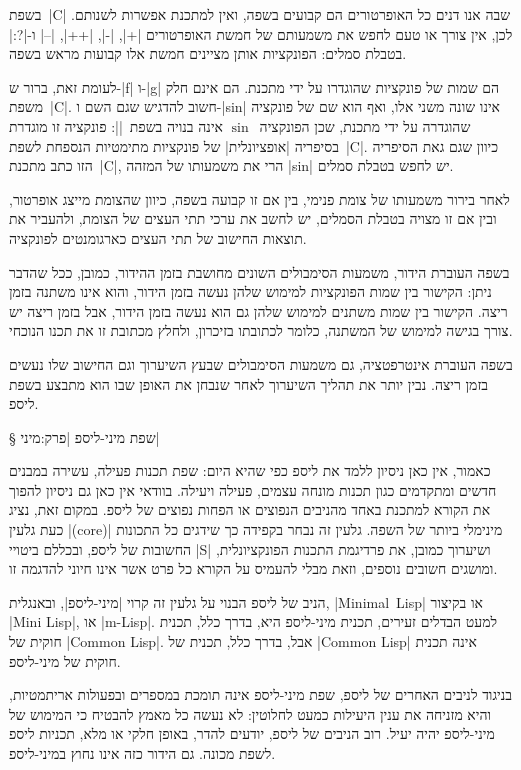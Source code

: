 בשפת~\E|C| שבה אנו דנים כל האופרטורים הם קבועים בשפה, ואין למתכנת אפשרות
לשנותם. לכן, אין צורך או טעם לחפש את משמעותם של חמשת האופרטורים \T|+|, \T|-|,
\T|++|, \T|--| ו-\T|?:| בטבלת סמלים: הפונקציות אותן מציינים חמשת אלו קבועות
מראש בשפה.

לעומת זאת, ברור ש-\T|f| ו-\T|g| הם שמות של פונקציות שהוגדרו על ידי מתכנת. הם
אינם חלק משפת~\E|C|. חשוב להדגיש שגם השם ו-\T|sin| אינו שונה משני אלו, ואף הוא
שם של פונקציה שהוגדרה על ידי מתכנת, שכן הפונקציה~$\sin$ אינה בנויה
בשפת~\E|\CPL|: פונקציה זו מוגדרת בסיפריה \ע|אופציונלית| של פונקציות מתימטיות
הנספחת לשפת~\E|C|. כיוון שגם גאת הסיפריה הזו כתב מתכנת~\E|C|, הרי את משמעותו
של המזהה \T|sin| יש לחפש בטבלת סמלים.

לאחר בירור משמעותו של צומת פנימי, בין אם זו קבועה בשפה, כיוון שהצומת מייצג
אופרטור, ובין אם זו מצויה בטבלת הסמלים, יש לחשב את ערכי תתי העצים של הצומת,
ולהעביר את תוצאות החישוב של תתי העצים כארגומנטים לפונקציה.

בשפה העוברת הידור, משמעות הסימבולים השונים מחושבת בזמן ההידור, כמובן, ככל שהדבר
ניתן: הקישור בין שמות הפונקציות למימוש שלהן נעשה בזמן הידור, והוא אינו משתנה
בזמן ריצה. הקישור בין שמות משתנים למימוש שלהן גם הוא נעשה בזמן הידור, אבל בזמן
ריצה יש צורך בגישה למימוש של המשתנה, כלומר לכתובתו בזיכרון, ולחלץ מכתובת זו את
תכנו הנוכחי.

בשפה העוברת אינטרפטציה, גם משמעות הסימבולים שבעץ השיערוך וגם החישוב שלו נעשים
בזמן ריצה. נבין יותר את תהליך השיערוך לאחר שנבחן את האופן שבו הוא מתבצע בשפת
ליספ.

§ שפת מיני-ליספ
|פרק:מיני|

כאמור, אין כאן ניסיון ללמד את ליספ כפי שהיא היום: שפת תכנות פעילה, עשירה
במבנים חדשים ומתקדמים כגון תכנות מונחה עצמים, פעילה ויעילה. בוודאי אין כאן גם
ניסיון להפוך את הקורא למתכנת באחד מהניבים הנפוצים או הפחות נפוצים של ליספ.
במקום זאת, נציג כעת גלעין \E|(core)| מינימלי ביותר של השפה. גלעין זה נבחר
בקפידה כך שידגים כל התכונות החשובות של ליספ, ובכללם ביטויי \E|S| ושיערוך כמובן,
את פרדיגמת התכנות הפונקציונלית, ומושגים חשובים נוספים, וזאת מבלי להעמיס על
הקורא כל פרט אשר אינו חיוני להדגמה זו.

הניב של ליספ הבנוי על גלעין זה קרוי \ע|מיני-ליספ|, ובאנגלית, \E|Minimal~Lisp|
או בקיצור \E|Mini Lisp|, או \E|m-Lisp|. למעט הבדלים זעירים, תכנית מיני-ליספ
היא, בדרך כלל, תכנית חוקית של \E|Common Lisp|. אבל, בדרך כלל, תכנית של
\E|Common Lisp| אינה תכנית חוקית של מיני-ליספ.

בניגוד לניבים האחרים של ליספ, שפת מיני-ליספ אינה תומכת במספרים ובפעולות
אריתמטיות, והיא מזניחה את ענין היעילות כמעט לחלוטין: לא נעשה כל מאמץ להבטיח כי
המימוש של מיני-ליספ יהיה יעיל. רוב הניבים של ליספ, יודעים להדר, באופן
חלקי או מלא, תכניות ליספ לשפת מכונה. גם הידור כזה אינו נחוץ במיני-ליספ.

